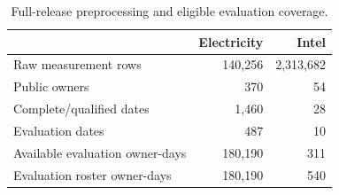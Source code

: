 \begin{table}[t]\centering
\caption{Full-release preprocessing and eligible evaluation coverage.}
\label{tab:data}
\begin{tabular}{@{}lrr@{}}\toprule
&Electricity&Intel\\\midrule
Raw measurement rows&140,256&2,313,682\\
Public owners&370&54\\
Complete/qualified dates&1,460&28\\
Evaluation dates&487&10\\
Available evaluation owner-days&180,190&311\\
Evaluation roster owner-days&180,190&540\\\bottomrule
\end{tabular}\end{table}
